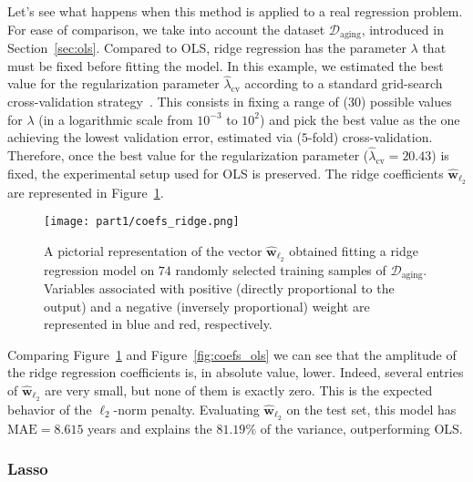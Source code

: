 			Let's see what happens when this method is applied to a real regression problem. For ease of comparison, we take into account the dataset $\mathcal{D}_{\text{aging}}$, introduced in Section~\ref{sec:ols}.
			Compared to OLS, ridge regression has the parameter $\lambda$ that must be fixed before fitting the model. In this example, we estimated the best value for the regularization parameter $\hat \lambda_{\text{cv}}$ according to a standard grid-search cross-validation strategy~\cite{hastie2009elements}.
			This consists in fixing a range of ($30$) possible values for $\lambda$ (in a logarithmic scale from $10^{-3}$ to $10^2$) and
			pick the best value as the one achieving the lowest validation error, estimated via ($5$-fold) cross-validation.
			Therefore, once the best value for the regularization parameter ($\hat \lambda_{\text{cv}} = 20.43$) is fixed, the experimental setup used for OLS is preserved.
			The ridge coefficients $\bm{\hat w}_{\ell_2}$ are represented in Figure~\ref{fig:coefs_ridge}.
			\begin{figure}[!h]
				\centering
				\texttt{[image: part1/coefs\_ridge.png]}
				\caption{A pictorial representation of the vector $\bm{\hat w}_{\ell_2}$ obtained fitting a ridge regression model on $74$ randomly selected training samples of $\mathcal{D}_{\text{aging}}$. Variables associated with positive (\ie directly proportional to the output) and a negative (\ie inversely proportional) weight are represented in blue and red, respectively.} \label{fig:coefs_ridge}
			\end{figure}
			Comparing Figure~\ref{fig:coefs_ridge} and Figure~\ref{fig:coefs_ols} we can see that the amplitude of the ridge regression coefficients is, in absolute value, lower. Indeed, several entries of $\bm{\hat w}_{\ell_2}$ are very small, but none of them is exactly zero. This is the expected behavior of the $\ell_2$-norm penalty. Evaluating $\bm{\hat w}_{\ell_2}$ on the test set, this model has  $\text{MAE}=8.615$ years and explains the $81.19\%$ of the variance, outperforming OLS.

			\subsubsection{Lasso} \label{sec:the_lasso}

